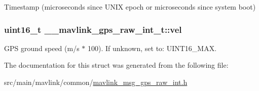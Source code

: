 Timestamp (microseconds since U\+N\+I\+X epoch or microseconds since system boot) 

\hypertarget{struct____mavlink__gps__raw__int__t_a77e8cbdbf554637e4fbbdaaabd562eaf}{
\subsubsection[{vel}]{\setlength{\rightskip}{0pt plus 5cm}uint16\+\_\+t \+\_\+\+\_\+mavlink\+\_\+gps\+\_\+raw\+\_\+int\+\_\+t\+::vel}}\label{struct____mavlink__gps__raw__int__t_a77e8cbdbf554637e4fbbdaaabd562eaf}


G\+P\+S ground speed (m/s $\ast$ 100). If unknown, set to\+: U\+I\+N\+T16\+\_\+\+M\+A\+X. 



The documentation for this struct was generated from the following file\+:\begin{DoxyCompactItemize}
\item 
src/main/mavlink/common/\hyperlink{mavlink__msg__gps__raw__int_8h}{mavlink\+\_\+msg\+\_\+gps\+\_\+raw\+\_\+int.\+h}\end{DoxyCompactItemize}
